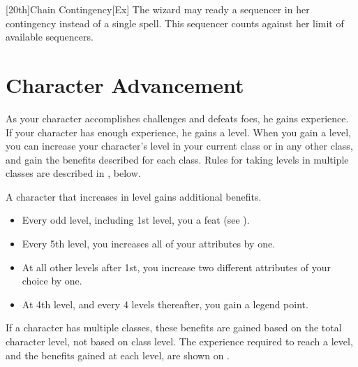 [20th]{Chain Contingency}[Ex]
The wizard may ready a sequencer in her contingency instead of a single spell.
This sequencer counts against her limit of available sequencers.

\section{Character Advancement}\label{Character Advancement}

As your character accomplishes challenges and defeats foes, he gains experience.
If your character has enough experience, he gains a level.
When you gain a level, you can increase your character's level in your current class or in any other class, and gain the benefits described for each class.
Rules for taking levels in multiple classes are described in , below.

A character that increases in level gains additional benefits.
\begin{itemize}
    \item Every odd level, including 1st level, you a feat (see ).
    \item Every 5th level, you increases all of your attributes by one.
    \item At all other levels after 1st, you increase two different attributes of your choice by one.
    \item At 4th level, and every 4 levels thereafter, you gain a legend point.
\end{itemize}

If a character has multiple classes, these benefits are gained based on the total character level, not based on class level.
The experience required to reach a level, and the benefits gained at each level, are shown on .

